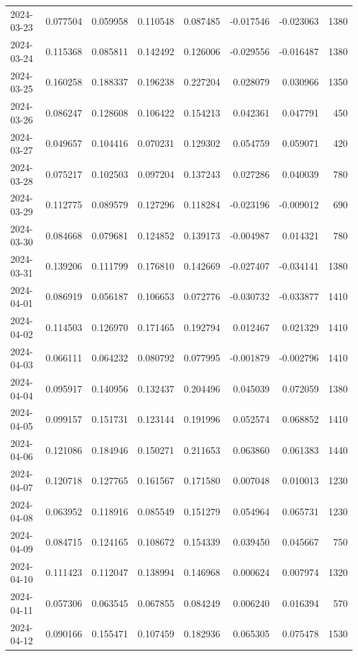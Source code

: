 \begin{tabular}{lrrrrrrr}
2024-03-23 & 0.077504 & 0.059958 & 0.110548 & 0.087485 & -0.017546 & -0.023063 & 1380 \\
2024-03-24 & 0.115368 & 0.085811 & 0.142492 & 0.126006 & -0.029556 & -0.016487 & 1380 \\
2024-03-25 & 0.160258 & 0.188337 & 0.196238 & 0.227204 & 0.028079 & 0.030966 & 1350 \\
2024-03-26 & 0.086247 & 0.128608 & 0.106422 & 0.154213 & 0.042361 & 0.047791 & 450 \\
2024-03-27 & 0.049657 & 0.104416 & 0.070231 & 0.129302 & 0.054759 & 0.059071 & 420 \\
2024-03-28 & 0.075217 & 0.102503 & 0.097204 & 0.137243 & 0.027286 & 0.040039 & 780 \\
2024-03-29 & 0.112775 & 0.089579 & 0.127296 & 0.118284 & -0.023196 & -0.009012 & 690 \\
2024-03-30 & 0.084668 & 0.079681 & 0.124852 & 0.139173 & -0.004987 & 0.014321 & 780 \\
2024-03-31 & 0.139206 & 0.111799 & 0.176810 & 0.142669 & -0.027407 & -0.034141 & 1380 \\
2024-04-01 & 0.086919 & 0.056187 & 0.106653 & 0.072776 & -0.030732 & -0.033877 & 1410 \\
2024-04-02 & 0.114503 & 0.126970 & 0.171465 & 0.192794 & 0.012467 & 0.021329 & 1410 \\
2024-04-03 & 0.066111 & 0.064232 & 0.080792 & 0.077995 & -0.001879 & -0.002796 & 1410 \\
2024-04-04 & 0.095917 & 0.140956 & 0.132437 & 0.204496 & 0.045039 & 0.072059 & 1380 \\
2024-04-05 & 0.099157 & 0.151731 & 0.123144 & 0.191996 & 0.052574 & 0.068852 & 1410 \\
2024-04-06 & 0.121086 & 0.184946 & 0.150271 & 0.211653 & 0.063860 & 0.061383 & 1440 \\
2024-04-07 & 0.120718 & 0.127765 & 0.161567 & 0.171580 & 0.007048 & 0.010013 & 1230 \\
2024-04-08 & 0.063952 & 0.118916 & 0.085549 & 0.151279 & 0.054964 & 0.065731 & 1230 \\
2024-04-09 & 0.084715 & 0.124165 & 0.108672 & 0.154339 & 0.039450 & 0.045667 & 750 \\
2024-04-10 & 0.111423 & 0.112047 & 0.138994 & 0.146968 & 0.000624 & 0.007974 & 1320 \\
2024-04-11 & 0.057306 & 0.063545 & 0.067855 & 0.084249 & 0.006240 & 0.016394 & 570 \\
2024-04-12 & 0.090166 & 0.155471 & 0.107459 & 0.182936 & 0.065305 & 0.075478 & 1530 \\

\end{tabular}

